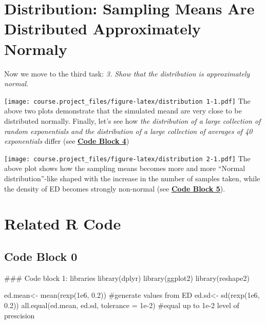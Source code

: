 \documentclass[]{article}
\newenvironment{Shaded}{}{}
\newcommand{\KeywordTok}[1]{\textcolor[rgb]{0.00,0.00,1.00}{{#1}}}
\newcommand{\DataTypeTok}[1]{{#1}}
\newcommand{\FloatTok}[1]{{#1}}
\newcommand{\StringTok}[1]{\textcolor[rgb]{0.00,0.50,0.50}{{#1}}}
\newcommand{\CommentTok}[1]{\textcolor[rgb]{0.00,0.50,0.00}{{#1}}}
\newcommand{\NormalTok}[1]{{#1}}
\begin{document}
\section{Distribution: Sampling Means Are Distributed Approximately
Normaly}\label{distribution-sampling-means-are-distributed-approximately-normaly}

Now we move to the third task: \emph{3. Show that the distribution is
approximately normal.}

\texttt{[image: course.project\_files/figure-latex/distribution 1-1.pdf]}
The above two plots demonstrate that the simulated meand are very close
to be distributed normally. Finally, let's see how \emph{the
distribution of a large collection of random exponentials and the
distribution of a large collection of averages of 40 exponentials}
differ (see \textbf{\hyperref[code-block-4]{Code Block 4}})

\texttt{[image: course.project\_files/figure-latex/distribution 2-1.pdf]}
The above plot shows how the sampling means becomes more and more
``Normal distribution''-like shaped with the increase in the number of
samples taken, while the density of ED becomes strongly non-normal (see
\textbf{\hyperref[code-block-5]{Code Block 5}}).

\section{Related R Code}\label{related-r-code}

\subsection{Code Block 0}\label{code-block-0}

\begin{Shaded}
\begin{Highlighting}[]
\NormalTok{### Code block 1: libraries}
\KeywordTok{library}\NormalTok{(dplyr)}
\KeywordTok{library}\NormalTok{(ggplot2)}
\KeywordTok{library}\NormalTok{(reshape2)}
\end{Highlighting}
\end{Shaded}


\begin{Shaded}
\begin{Highlighting}[]
\NormalTok{ed.mean<-}\StringTok{ }\KeywordTok{mean}\NormalTok{(}\KeywordTok{rexp}\NormalTok{(}\FloatTok{1e6}\NormalTok{, }\FloatTok{0.2}\NormalTok{)) }\CommentTok{#generate values from ED}
\NormalTok{ed.sd<-}\StringTok{ }\KeywordTok{sd}\NormalTok{(}\KeywordTok{rexp}\NormalTok{(}\FloatTok{1e6}\NormalTok{, }\FloatTok{0.2}\NormalTok{))}
\KeywordTok{all.equal}\NormalTok{(ed.mean, ed.sd, }\DataTypeTok{tolerance =} \FloatTok{1e-2}\NormalTok{) }\CommentTok{#equal up to 1e-2 level of prescision}
\end{Highlighting}
\end{Shaded}
\end{document}
